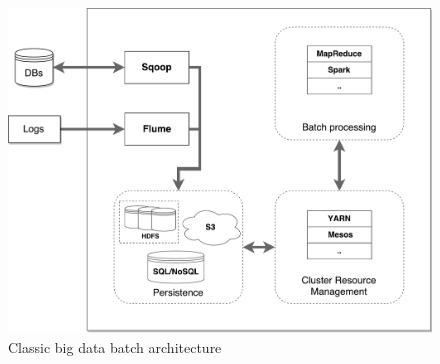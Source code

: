  \begin{figure}[ht!]
\includegraphics[width=1\textwidth]{images/batch_architecture.pdf}
 \caption{Classic big data batch architecture}
\label{fig:batch_architecture}
\end{figure}

